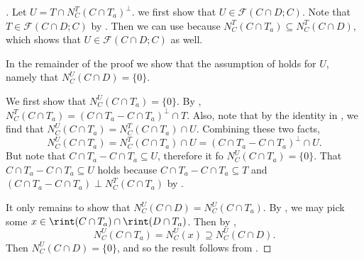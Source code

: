 \documentclass{article}
\theoremstyle{plain}
\theoremstyle{definition}
\theoremstyle{remark}
\begin{document}
\begin{proof}[\hypertarget{loc:generated_supporting_subspace_of_one_of_the_two_convex_sets.proof}Proof of \Cref{loc:generated_supporting_subspace_of_one_of_the_two_convex_sets.statement}]

Let $U = T \cap N_C^T(C \cap T_a)^\perp$.
we first show that $U \in \mathcal{F}(C \cap D; C)$. Note that
$T \in \mathcal{F}(C \cap D; C)$ by .
Then we can use
because $N_C^T(C \cap T_a) \subseteq N_C^T(C \cap D)$, which shows that $U \in \mathcal{F}(C \cap D; C)$ as well. 

In the remainder of the proof we show that the assumption of
holds for $U$, namely that $N_C^U(C \cap D) = \{0\}$. 

We first show that $N_C^U(C \cap T_a) = \{0\}$. By
, $N_C^T(C \cap T_a) = (C \cap T_a - C \cap T_a)^\perp \cap T$. 
Also, note that by the identity in 
,
we find that $N_C^U(C \cap T_a)= N_C^T(C \cap T_a) \cap U$.
Combining these two facts,
\begin{equation*}
N_C^U(C \cap T_a) = N_C^T(C \cap T_a) \cap U = (C \cap T_a - C \cap T_a)^\perp  \cap U.
\end{equation*}
But note that $C \cap T_a - C \cap T_a \subseteq U$, therefore it fo $N_C^U(C \cap T_a)= \{ 0 \}$.  That $C \cap T_a - C \cap T_a \subseteq U$ holds because $C \cap T_a - C \cap T_a \subseteq T$ and $(C \cap T_a - C \cap T_a) \perp N_C^T(C \cap T_a)$ by . 

It only remains to show that $N_C^U(C \cap D)=N_C^U(C \cap T_a)$.  By
,
we may pick some $x \in \rint(C \cap T_a) \cap \rint(D \cap T_a)$. Then by
,
\begin{equation*}
N_{C}^U(C \cap T_a) = N_{C}^U(x) \supseteq N_C^U(C \cap D).
\end{equation*}
Then $N_C^U(C \cap D)=\{ 0 \}$, and so the result follows from . 
\end{proof}
\end{document}
